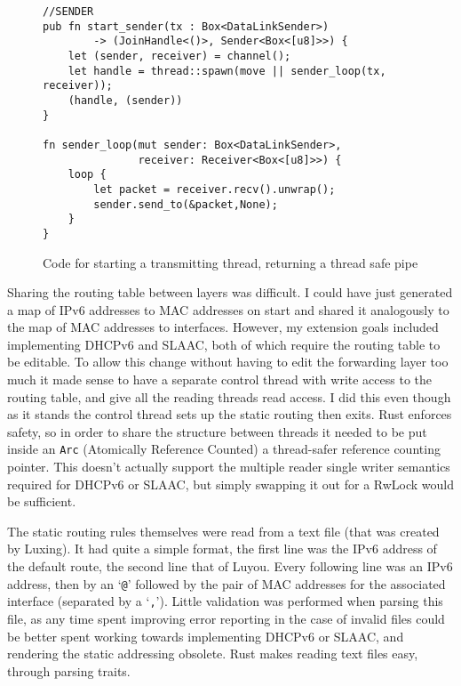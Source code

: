 \documentclass[12pt,a4paper,twoside,openright]{report}
\begin{document}
\begin{figure}
\centering
\begin{varwidth}{\linewidth}
\begin{verbatim}
//SENDER
pub fn start_sender(tx : Box<DataLinkSender>) 
 		-> (JoinHandle<()>, Sender<Box<[u8]>>) {
    let (sender, receiver) = channel();
    let handle = thread::spawn(move || sender_loop(tx, receiver));
    (handle, (sender))
}

fn sender_loop(mut sender: Box<DataLinkSender>, 
			   receiver: Receiver<Box<[u8]>>) {
    loop {
        let packet = receiver.recv().unwrap();
        sender.send_to(&packet,None);
    }
}
\end{verbatim}
\end{varwidth}
\caption{Code for starting a transmitting thread, returning a thread safe pipe}
\label{fig::sending}
\end{figure}

\bigskip

Sharing the routing table between layers was difficult.  I could have just generated a map of IPv6 addresses to MAC addresses on start and shared it analogously to the map of MAC addresses to interfaces. However, my extension goals included implementing DHCPv6 and SLAAC, both of which require the routing table to be editable.  To allow this change without having to edit the forwarding layer too much it made sense to have a separate control thread with write access to the routing table, and give all the reading threads read access.  I did this even though as it stands the control thread sets up the static routing then exits.  Rust enforces safety, so in order to share the structure between threads it needed to be put inside an \verb!Arc! (Atomically Reference Counted)\cite{rust_arc} a thread-safer reference counting pointer.  This doesn't actually support the multiple reader single writer semantics required for DHCPv6 or SLAAC, but simply swapping it out for a RwLock\cite{rust_rwlock} would be sufficient.

\bigskip

The static routing rules themselves were read from a text file (that was created by Luxing). It had quite a simple format, the first line was the IPv6 address of the default route, the second line that of Luyou.  Every following line was an IPv6 address, then by an `\verb!@!' followed by the pair of MAC addresses for the associated interface (separated by a `\verb!,!').  Little validation was performed when parsing this file, as any time spent improving error reporting in the case of invalid files could be better spent working towards implementing DHCPv6 or SLAAC, and rendering the static addressing obsolete. Rust makes reading text files easy, through parsing traits.
\end{document}

